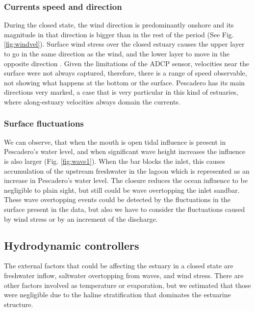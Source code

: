 \documentclass[tesis.tex]{subfiles}
\begin{document}
\subsubsection{Currents speed and direction}

During the closed state, the wind direction is predominantly onshore and its magnitude in that direction is bigger than in the rest of the period (See Fig. \ref{fig:windvel}). Surface wind stress over the closed estuary causes the upper layer to go in the same direction as the wind, and the lower layer to move in the opposite direction \citep{Katopodes2018}. Given the limitations of the ADCP sensor, velocities near the surface were not always captured, therefore, there is a range of speed observable, not showing what happens at the bottom or the surface. Pescadero has its main directions very marked, a case that is very particular in this kind of estuaries, where along-estuary velocities always domain the currents. \\

\subsubsection{Surface fluctuations}

We can observe, that when the mouth is open tidal influence is present in Pescadero's water level, and when significant wave height increases the influence is also larger (Fig. \ref{fig:wave1}). When the bar blocks the inlet, this causes accumulation of the upstream freshwater in the lagoon which is represented as an increase in Pescadero's water level. The closure reduces the ocean influence to be negligible to plain sight, but still could be wave overtopping the inlet sandbar. These wave overtopping events could be detected by the fluctuations in the surface present in the data, but also we have to consider the fluctuations caused by wind stress or by an increment of the discharge.\\

\subsection{Hydrodynamic controllers}

The external factors that could be affecting the estuary in a closed state are freshwater inflow, saltwater overtopping from waves, and wind stress. There are other factors involved as temperature or evaporation, but we estimated that those were negligible due to the haline stratification that dominates the estuarine structure.\\
\end{document}
